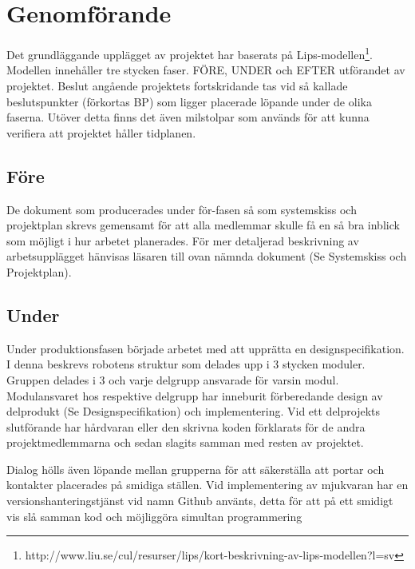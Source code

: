 ﻿\documentclass[a4paper,12pt,fleqn]{article}
\begin{document}
\section{Genomförande}

Det grundläggande upplägget av projektet har baserats på Lips-modellen\footnote{http://www.liu.se/cul/resurser/lips/kort-beskrivning-av-lips-modellen?l=sv}. Modellen innehåller tre stycken faser. FÖRE, UNDER och EFTER utförandet av projektet. Beslut angående projektets fortskridande tas vid så kallade beslutspunkter (förkortas BP) som ligger placerade löpande under de olika faserna. Utöver detta finns det även milstolpar som används för att kunna verifiera att projektet håller tidplanen. 

\subsection{Före}
De dokument som producerades under för-fasen så som systemskiss och projektplan skrevs gemensamt för att alla medlemmar skulle få en så bra inblick som möjligt i hur arbetet planerades. För mer detaljerad beskrivning av arbetsupplägget hänvisas läsaren till ovan nämnda dokument (Se Systemskiss och Projektplan).

\subsection{Under}
Under produktionsfasen började arbetet med att upprätta en designspecifikation. I denna beskrevs robotens struktur som delades upp i 3 stycken moduler. Gruppen delades i 3 och varje delgrupp ansvarade för varsin modul. Modulansvaret hos respektive delgrupp har inneburit förberedande design av delprodukt (Se Designspecifikation) och implementering. 
Vid ett delprojekts slutförande har hårdvaran eller den skrivna koden förklarats för de andra projektmedlemmarna och sedan slagits samman med resten av projektet. 

Dialog hölls även löpande mellan grupperna för att säkerställa att portar och kontakter placerades på smidiga ställen. Vid implementering av mjukvaran har en versionshanteringstjänst vid namn Github använts, detta för att på ett smidigt vis slå samman kod och möjliggöra simultan programmering
\end{document}
